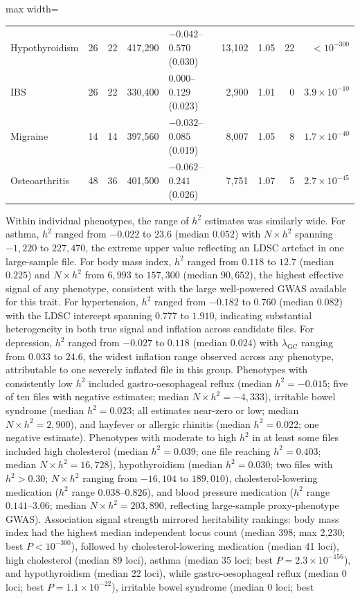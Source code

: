 \documentclass[11pt,a4paper]{article}
\begin{document}
\begin{table}[H]
\begin{adjustbox}{max width=\textwidth}
\begin{tabular}{lrrrlrrrr}
\addlinespace
Hypothyroidism &26 & 22 & 417,290 &$-0.042$--$0.570$ (0.030) &13,102 & 1.05 & 22 &$< 10^{-300}$ \\
\addlinespace
IBS &26 & 22 & 330,400 &$0.000$--$0.129$ (0.023) &2,900 & 1.01 & 0 &$3.9 \times 10^{-10}$ \\
\addlinespace
Migraine &14 & 14 & 397,560 &$-0.032$--$0.085$ (0.019) &8,007 & 1.05 & 8 &$1.7 \times 10^{-40}$ \\
\addlinespace
Osteoarthritis &48 & 36 & 401,500 &$-0.062$--$0.241$ (0.026) &7,751 & 1.07 & 5 &$2.7 \times 10^{-45}$ \\
\bottomrule
\end{tabular}
\end{adjustbox}
\end{table}

Within individual phenotypes, the range of $h^2$ estimates was similarly wide. For asthma, $h^2$ ranged from $-0.022$ to $23.6$ (median $0.052$) with $N \times h^2$ spanning $-1{,}220$ to $227{,}470$, the extreme upper value reflecting an LDSC artefact in one large-sample file. For body mass index, $h^2$ ranged from $0.118$ to $12.7$ (median $0.225$) and $N \times h^2$ from $6{,}993$ to $157{,}300$ (median $90{,}652$), the highest effective signal of any phenotype, consistent with the large well-powered GWAS available for this trait. For hypertension, $h^2$ ranged from $-0.182$ to $0.760$ (median $0.082$) with the LDSC intercept spanning $0.777$ to $1.910$, indicating substantial heterogeneity in both true signal and inflation across candidate files. For depression, $h^2$ ranged from $-0.027$ to $0.118$ (median $0.024$) with $\lambda_{\text{GC}}$ ranging from $0.033$ to $24.6$, the widest inflation range observed across any phenotype, attributable to one severely inflated file in this group. Phenotypes with consistently low $h^2$ included gastro-oesophageal reflux (median $h^2 = -0.015$; five of ten files with negative estimates; median $N \times h^2 = -4{,}333$), irritable bowel syndrome (median $h^2 = 0.023$; all estimates near-zero or low; median $N \times h^2 = 2{,}900$), and hayfever or allergic rhinitis (median $h^2 = 0.022$; one negative estimate). Phenotypes with moderate to high $h^2$ in at least some files included high cholesterol (median $h^2 = 0.039$; one file reaching $h^2 = 0.403$; median $N \times h^2 = 16{,}728$), hypothyroidism (median $h^2 = 0.030$; two files with $h^2 > 0.30$; $N \times h^2$ ranging from $-16{,}104$ to $189{,}010$), cholesterol-lowering medication ($h^2$ range $0.038$--$0.826$), and blood pressure medication ($h^2$ range $0.141$--$3.06$; median $N \times h^2 = 203{,}890$, reflecting large-sample proxy-phenotype GWAS). Association signal strength mirrored heritability rankings: body mass index had the highest median independent locus count (median 398; max 2,230; best $P < 10^{-300}$), followed by cholesterol-lowering medication (median 41 loci), high cholesterol (median 89 loci), asthma (median 35 loci; best $P = 2.3 \times 10^{-156}$), and hypothyroidism (median 22 loci), while gastro-oesophageal reflux (median 0 loci; best $P = 1.1 \times 10^{-22}$), irritable bowel syndrome (median 0 loci; best 
\end{document}
